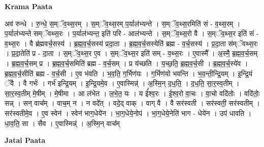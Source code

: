 \documentclass[17pt]{extarticle}
\begin{document}
\textbf{Krama Paata} \newline

अव॑ रुन्धे । रु॒न्धे॒ स॒म्ॅव॒थ्स॒रम् । स॒म्ॅव॒थ्स॒रम् प॒र्याल॑भ्यन्ते । स॒म्ॅव॒थ्स॒रमिति॑ सं - व॒थ्स॒रम् । प॒र्याल॑भ्यन्ते सम्ॅवथ्स॒रः । प॒र्याल॑भ्यन्त॒ इति॑ परि - आल॑भ्यन्ते । स॒म्ॅव॒थ्स॒रो वै । स॒म्ॅव॒थ्स॒र इति॑ सं - व॒थ्स॒रः । वै ब्र॑ह्मवर्च॒सस्य॑ । ब्र॒ह्म॒व॒र्च॒सस्य॑ प्रदा॒ता । ब्र॒ह्म॒व॒र्च॒सस्येति॑ ब्रह्म - व॒र्च॒सस्य॑ । प्र॒दा॒ता स॑म्ॅवथ्स॒रः । प्र॒दा॒तेति॑ प्र - दा॒ता । स॒म्ॅव॒थ्स॒र ए॒व । स॒म्ॅव॒थ्स॒र इति॑ सम् - व॒थ्स॒रः । ए॒वास्मै᳚ । अ॒स्मै॒ ब्र॒ह्म॒व॒र्च॒सम् । ब्र॒ह्म॒व॒र्च॒सम् प्र । ब्र॒ह्म॒व॒र्च॒समिति॑ ब्रह्म - व॒र्च॒सम् । प्र य॑च्छति । य॒च्छ॒ति॒ ब्र॒ह्म॒व॒र्च॒सी । ब्र॒ह्म॒व॒र्च॒स्ये॑व । ब्र॒ह्म॒व॒र्च॒सीति॑ ब्रह्म - व॒र्च॒सी । ए॒व भ॑वति । भ॒व॒ति॒ ग॒र्भिण॑यः । ग॒र्भिण॑यो भवन्ति । भ॒व॒न्ती॒न्द्रि॒यम् । इ॒न्द्रि॒यं ॅवै । वै गर्भः॑ । गर्भ॑ इन्द्रि॒यम् । इ॒न्द्रि॒यमे॒व । ए॒वास्मिन्न्॑ । अ॒स्मि॒न् द॒ध॒॒ति॒ । द॒ध॒ति॒ सा॒र॒स्व॒तीम् । सा॒र॒स्व॒तीम् मे॒षीम् । मे॒षीमा । आ ल॑भेत । ल॒भे॒त॒ यः । य ई᳚श्व॒रः । ई॒श्व॒रो वा॒चः । वा॒चो वदि॑तोः । वदि॑तोः॒ सन्न् । सन् वाच᳚म् । वाच॒म् न । न वदे᳚त् । वदे॒द् वाक् । वाग् वै । वै सर॑स्वती । सर॑स्वती॒ सर॑स्वतीम् । सर॑स्वतीमे॒व । ए॒व स्वेन॑ । स्वेन॑ भाग॒धेये॑न । भा॒ग॒धेये॒नोप॑ । भा॒ग॒धेये॒नेति॑ भाग - धेये॑न । उप॑ धावति । धा॒व॒ति॒ सा । सैव । ए॒वास्मिन्न्॑ । अ॒स्मि॒न् वाच᳚म् \newline

\textbf{Jatai Paata} \newline
\end{document}
